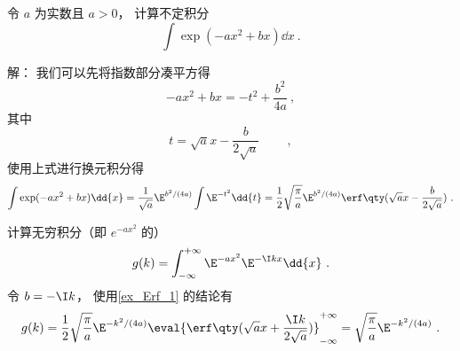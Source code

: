 \begin{example}{}\label{ex_Erf_1}
令 $a$ 为实数且 $a > 0$， 计算不定积分
\begin{equation}
\int \exp(-ax^2 + bx) \dd{x}~.
\end{equation}

解： 我们可以先将指数部分凑平方得
\begin{equation}
-ax^2 + bx = -t^2 + \frac{b^2}{4a}~,
\end{equation}
其中
\begin{equation}
t = \sqrt{a} x - \frac{b}{2\sqrt{a}} \qquad~,
\end{equation}
使用上式进行换元积分得
\begin{equation}
\int \exp(-ax^2 + bx) \dd{x} = \frac{1}{\sqrt{a}} \E^{{b^2}/(4a)} \int \E^{-t^2} \dd{t}
= \frac12 \sqrt{\frac{\pi}{a}} \E^{{b^2}/(4a)} \erf\qty(\sqrt{a} x - \frac{b}{2\sqrt{a}})~.
\end{equation}
\end{example}

\begin{example}{}\label{ex_Erf_2}
计算无穷积分（即 $e^{-ax^2}$ 的）
\begin{equation}
g(k) = \int_{-\infty}^{+\infty} \E^{-a x^2} \E^{-\I kx} \dd{x}~.
\end{equation}
令 $b = -\I k$， 使用\autoref{ex_Erf_1} 的结论有
\begin{equation}\label{eq_Erf_2}
g(k) = \frac12 \sqrt{\frac{\pi}{a}} \E^{-{k^2}/(4a)} \eval{\erf\qty(\sqrt{a} x + \frac{\I k}{2\sqrt{a}})}_{-\infty}^{+\infty} = \sqrt{\frac{\pi}{a}} \E^{-{k^2}/(4a)}~.
\end{equation}
\end{example}
